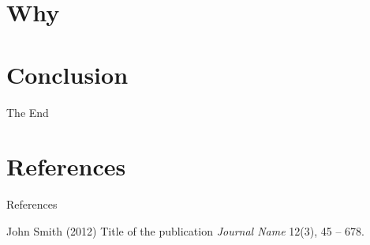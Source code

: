 \documentclass[aspectratio=169,xcolor=dvipsnames]{beamer}
\begin{document}
\section{Why}


\section{Conclusion}

\begin{frame}
    \Huge{\centerline{The End}}
\end{frame}

\section{References}

\begin{frame}{References}
    \footnotesize{
        \begin{thebibliography}{99}
             John Smith (2012)
            \newblock Title of the publication
            \newblock \emph{Journal Name} 12(3), 45 -- 678.
        \end{thebibliography}
    }
\end{frame}
\end{document}
